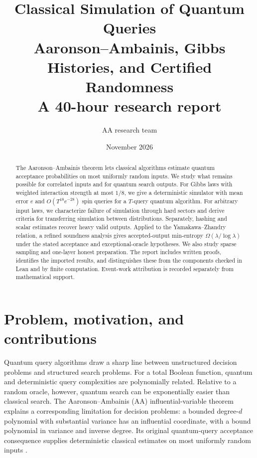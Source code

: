 \documentclass[11pt]{article}
\title{\textbf{Classical Simulation of Quantum Queries}\\[5pt]
{\Large Aaronson--Ambainis, Gibbs Histories, and Certified Randomness}\\[5pt]
{\large A 40-hour research report}}
\author{AA research team}
\date{November 2026}
\theoremstyle{definition}\newtheorem{definition}[theorem]{Definition}
\theoremstyle{remark}\newtheorem{remark}[theorem]{Remark}
\begin{document}
\maketitle
\thispagestyle{fancy}
\begin{abstract}
\noindent
The Aaronson--Ambainis theorem lets classical algorithms estimate quantum acceptance probabilities on most uniformly random inputs. We study what remains possible for correlated inputs and for quantum search outputs. For Gibbs laws with weighted interaction strength at most $1/8$, we give a deterministic simulator with mean error $e$ and $O(T^{18}e^{-28})$ spin queries for a $T$-query quantum algorithm. For arbitrary input laws, we characterize failure of simulation through hard sectors and derive criteria for transferring simulation between distributions. Separately, hashing and scalar estimates recover heavy valid outputs. Applied to the Yamakawa--Zhandry relation, a refined soundness analysis gives accepted-output min-entropy $\Omega(\lambda/\log\lambda)$ under the stated acceptance and exceptional-oracle hypotheses. We also study sparse sampling and one-layer honest preparation. The report includes written proofs, identifies the imported results, and distinguishes these from the components checked in Lean and by finite computation. Event-work attribution is recorded separately from mathematical support.
\end{abstract}
\tableofcontents
\clearpage

\section{Problem, motivation, and contributions}\label{sec:introduction}
Quantum query algorithms draw a sharp line between unstructured decision problems and structured search problems. For a total Boolean function, quantum and deterministic query complexities are polynomially related. Relative to a random oracle, however, quantum search can be exponentially easier than classical search. The Aaronson--Ambainis (AA) influential-variable theorem explains a corresponding limitation for decision problems: a bounded degree-$d$ polynomial with substantial variance has an influential coordinate, with a bound polynomial in variance and inverse degree. Its original quantum-query acceptance consequence supplies deterministic classical estimates on most uniformly random inputs \cite{AA14,Tur26,BDST26}.
\end{document}
